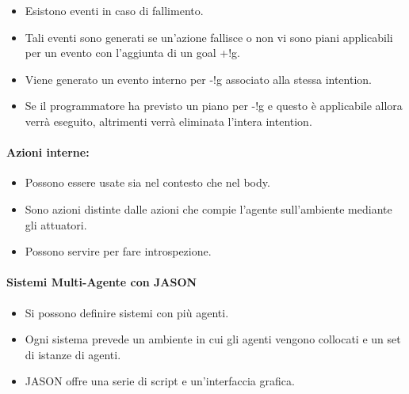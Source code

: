 \begin{itemize}
  \item Esistono eventi in caso di fallimento. 
  \item Tali eventi sono generati se un'azione fallisce o non vi sono piani applicabili per un evento con l'aggiunta di un goal +!g. 
  \item Viene generato un evento interno per -!g associato alla stessa intention.
  \item Se il programmatore ha previsto un piano per -!g e questo è applicabile allora verrà eseguito, altrimenti verrà eliminata l'intera intention.
\end{itemize}

\paragraph{Azioni interne:}

\begin{itemize}
  \item Possono essere usate sia nel contesto che nel body. 
  \item Sono azioni distinte dalle azioni che compie l'agente sull'ambiente mediante gli attuatori. 
  \item Possono servire per fare introspezione.
\end{itemize}

\paragraph{Sistemi Multi-Agente con JASON}

\begin{itemize}
  \item Si possono definire sistemi con più agenti. 
  \item Ogni sistema prevede un ambiente in cui gli agenti vengono collocati e un set di istanze di agenti. 
  \item JASON offre una serie di script e un'interfaccia grafica.
\end{itemize}





